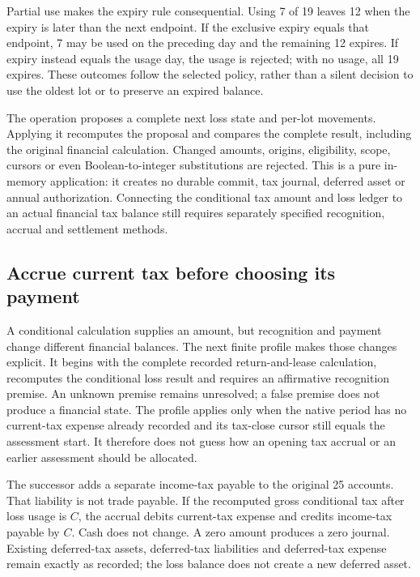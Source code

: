 Partial use makes the expiry rule consequential. Using 7 of 19 leaves 12 when
the expiry is later than the next endpoint. If the exclusive expiry equals that
endpoint, 7 may be used on the preceding day and the remaining 12 expires.
If expiry instead equals the usage day, the usage is rejected; with no usage,
all 19 expires. These outcomes follow the selected policy, rather than a
silent decision to use the oldest lot or to preserve an expired balance.

The operation proposes a complete next loss state and per-lot movements.
Applying it recomputes the proposal and compares the complete result, including
the original financial calculation. Changed amounts, origins, eligibility,
scope, cursors or even Boolean-to-integer substitutions are rejected. This is
a pure in-memory application: it creates no durable commit, tax journal,
deferred asset or annual authorization. Connecting the conditional tax amount
and loss ledger to an actual financial tax balance still requires separately
specified recognition, accrual and settlement methods.

\subsection{Accrue current tax before choosing its payment}

A conditional calculation supplies an amount, but recognition and payment
change different financial balances. The next finite profile makes those
changes explicit. It begins with the complete recorded return-and-lease
calculation, recomputes the conditional loss result and requires an affirmative
recognition premise. An unknown premise remains unresolved; a false premise
does not produce a financial state. The profile applies only when the native
period has no current-tax expense already recorded and its tax-close cursor
still equals the assessment start. It therefore does not guess how an opening
tax accrual or an earlier assessment should be allocated.

The successor adds a separate income-tax payable to the original 25 accounts.
That liability is not trade payable. If the recomputed gross conditional tax
after loss usage is $C$, the accrual debits current-tax expense and credits
income-tax payable by $C$. Cash does not change. A zero amount produces a zero
journal. Existing deferred-tax assets, deferred-tax liabilities and deferred-tax
expense remain exactly as recorded; the loss balance does not create a new
deferred asset.

